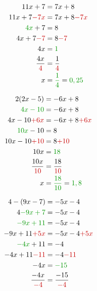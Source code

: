 \begin{pagesolutions}
    \begin{tcolorbox}[cartesolution={9}]
        \begin{align*}
            11x + 7 &= 7x + 8 \\
            11x + 7 \modif{- 7x} &= 7x + 8 \modif{- 7x} \\
            \reduc{4x} + 7 &= 8 \\
            4x + 7 \modif{- 7} &= 8 \modif{- 7} \\
            4x &= \reduc{1} \\
            \frac{4x}{\modif{4}} &= \frac{1}{\modif{4}} \\
            x &= \reduc{\frac{1}{4}} = \reduc{0,25}
        \end{align*}
    \end{tcolorbox}
    \begin{tcolorbox}[cartesolution={10}]
        \begin{align*}
            2(2x - 5) &= -6x + 8 \\
            \reduc{4x - 10} &= -6x + 8 \\
            4x - 10 \modif{+ 6x} &= -6x + 8 \modif{+ 6x} \\
            \reduc{10x} - 10 &= 8 \\
            10x - 10 \modif{+ 10} &= 8 \modif{+ 10} \\
            10x &= \reduc{18} \\
            \frac{10x}{\modif{10}} &= \frac{18}{\modif{10}} \\
            x &= \reduc{\frac{18}{10}} = \reduc{1,8}
        \end{align*}
    \end{tcolorbox}
    \begin{tcolorbox}[cartesolution={11}]
        \begin{align*}
            4 - (9x - 7) &= -5x - 4 \\
            4 \reduc{- 9x + 7} &= -5x - 4 \\
            \reduc{-9x + 11} &= -5x - 4 \\
            -9x + 11 \modif{+ 5x} &= -5x - 4 \modif{+ 5x} \\
            \reduc{-4x} + 11 &= -4 \\
            -4x + 11 \modif{- 11} &= -4 \modif{- 11} \\
            -4x &= \reduc{-15} \\
            \frac{-4x}{\modif{-4}} &= \frac{-15}{\modif{-4}} \\

\end{align*}
\end{tcolorbox}
\end{pagesolutions}
